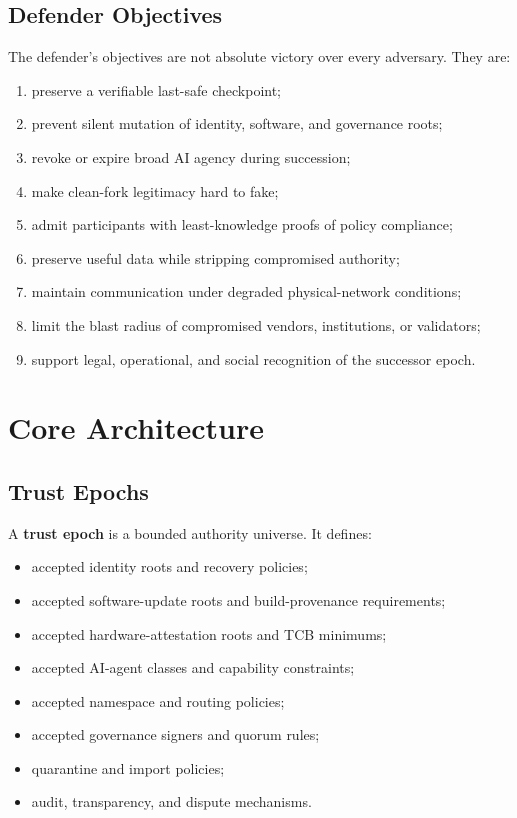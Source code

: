 \documentclass[11pt,letterpaper]{article}
\newcommand{\Term}[1]{\textbf{#1}}
\begin{document}
\subsection{Defender Objectives}

The defender's objectives are not absolute victory over every adversary. They are:

\begin{enumerate}[leftmargin=1.6em]
\item preserve a verifiable last-safe checkpoint;
\item prevent silent mutation of identity, software, and governance roots;
\item revoke or expire broad AI agency during succession;
\item make clean-fork legitimacy hard to fake;
\item admit participants with least-knowledge proofs of policy compliance;
\item preserve useful data while stripping compromised authority;
\item maintain communication under degraded physical-network conditions;
\item limit the blast radius of compromised vendors, institutions, or validators;
\item support legal, operational, and social recognition of the successor epoch.
\end{enumerate}

\section{Core Architecture}

\subsection{Trust Epochs}

A \Term{trust epoch} is a bounded authority universe. It defines:

\begin{itemize}[leftmargin=1.4em]
\item accepted identity roots and recovery policies;
\item accepted software-update roots and build-provenance requirements;
\item accepted hardware-attestation roots and TCB minimums;
\item accepted AI-agent classes and capability constraints;
\item accepted namespace and routing policies;
\item accepted governance signers and quorum rules;
\item quarantine and import policies;
\item audit, transparency, and dispute mechanisms.
\end{itemize}
\end{document}
